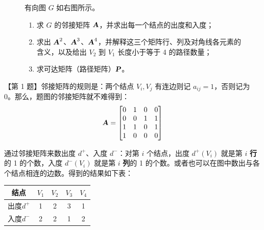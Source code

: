 \documentclass[UTF8]{ctexart}
\newcommand\A{\text{\slshape\bfseries A}}
\renewcommand\P{\text{\slshape\bfseries P}}
\begin{document}
\begin{figure}[htb]
\color{cyan!50!black}
\begin{minipage}[c]{0.65\textwidth}
\vspace{0cm}

有向图 $G$ 如右图所示。
\begin{enumerate}[itemsep=0pt, parsep=0pt]
    \item 求 $G$ 的邻接矩阵 $\A$，并求出每一个结点的出度和入度；
    \item 求出 $\A^2$、$\A^3$、$\A^4$，并解释这三个矩阵行、列及对角线各元素的含义，以及给出 $V_2$ 到 $V_1$ 长度小于等于 4 的路径数量；
    \item 求可达矩阵（路径矩阵）$\P$。
\end{enumerate}
\end{minipage}
\begin{minipage}[c]{0.34\textwidth}
\centering

\vspace{0cm}
\end{minipage}
\end{figure}

【第 1 题】邻接矩阵的规则是：两个结点 $V_i,V_j$ 有连边则记 $a_{ij}=1$，否则记为 0。那么，题图的邻接矩阵就不难得到：
\begin{equation}
    \A = \begin{bmatrix} 0&1&0&0 \\ 0&0&1&1 \\ 1&1&0&1 \\ 1&0&0&0  \end{bmatrix}
\end{equation}

通过邻接矩阵来数出度 $d^+$、入度 $d^-$：对第 $i$ 个结点，出度 $d^+(V_i)$ 就是第 $i$ \textbf{行}的 1 的个数，入度 $d^-(V_i)$ 就是第 $i$ \textbf{列}的 1 的个数。或者也可以在图中数出与各个结点相连的边数。得到的结果如下表：
\begin{table}[htb]
  \centering
  \begin{tabular}{ccccc}
  \toprule
    结点 & $V_1$ & $V_2$ & $V_3$ & $V_4$ \\
  \midrule
    出度$d^+$ & 1 & 2 & 3 & 1\\
    入度$d^-$ & 2 & 2 & 1 & 2\\
  \bottomrule
  \end{tabular}
\end{table}
    
\end{document}
